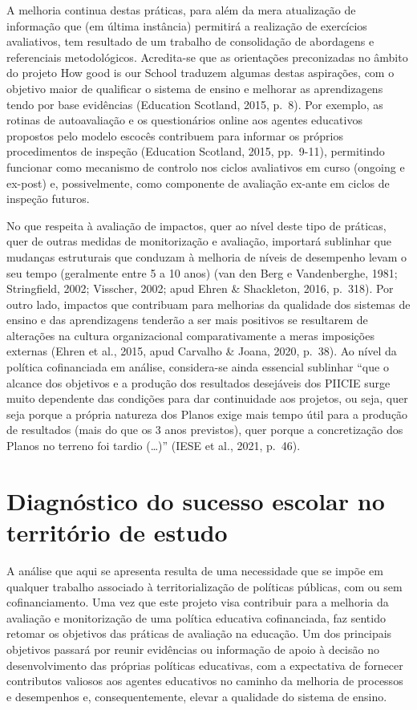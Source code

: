\documentclass[
]{book}
\begin{document}
A melhoria continua destas práticas, para além da mera atualização de informação que (em última instância) permitirá a realização de exercícios avaliativos, tem resultado de um trabalho de consolidação de abordagens e referenciais metodológicos. Acredita-se que as orientações preconizadas no âmbito do projeto How good is our School traduzem algumas destas aspirações, com o objetivo maior de qualificar o sistema de ensino e melhorar as aprendizagens tendo por base evidências (Education Scotland, 2015, p.~8). Por exemplo, as rotinas de autoavaliação e os questionários online aos agentes educativos propostos pelo modelo escocês contribuem para informar os próprios procedimentos de inspeção (Education Scotland, 2015, pp.~9-11), permitindo funcionar como mecanismo de controlo nos ciclos avaliativos em curso (ongoing e ex-post) e, possivelmente, como componente de avaliação ex-ante em ciclos de inspeção futuros.

No que respeita à avaliação de impactos, quer ao nível deste tipo de práticas, quer de outras medidas de monitorização e avaliação, importará sublinhar que mudanças estruturais que conduzam à melhoria de níveis de desempenho levam o seu tempo (geralmente entre 5 a 10 anos) (van den Berg e Vandenberghe, 1981; Stringfield, 2002; Visscher, 2002; apud Ehren \& Shackleton, 2016, p.~318). Por outro lado, impactos que contribuam para melhorias da qualidade dos sistemas de ensino e das aprendizagens tenderão a ser mais positivos se resultarem de alterações na cultura organizacional comparativamente a meras imposições externas (Ehren et al., 2015, apud Carvalho \& Joana, 2020, p.~38). Ao nível da política cofinanciada em análise, considera-se ainda essencial sublinhar ``que o alcance dos objetivos e a produção dos resultados desejáveis dos PIICIE surge muito dependente das condições para dar continuidade aos projetos, ou seja, quer seja porque a própria natureza dos Planos exige mais tempo útil para a produção de resultados (mais do que os 3 anos previstos), quer porque a concretização dos Planos no terreno foi tardio (\ldots)'' (IESE et al., 2021, p.~46).

\hypertarget{diagnuxf3stico-do-sucesso-escolar-no-territuxf3rio-de-estudo}{%
\chapter{Diagnóstico do sucesso escolar no território de estudo}\label{diagnuxf3stico-do-sucesso-escolar-no-territuxf3rio-de-estudo}}

A análise que aqui se apresenta resulta de uma necessidade que se impõe em qualquer trabalho associado à territorialização de políticas públicas, com ou sem cofinanciamento. Uma vez que este projeto visa contribuir para a melhoria da avaliação e monitorização de uma política educativa cofinanciada, faz sentido retomar os objetivos das práticas de avaliação na educação. Um dos principais objetivos passará por reunir evidências ou informação de apoio à decisão no desenvolvimento das próprias políticas educativas, com a expectativa de fornecer contributos valiosos aos agentes educativos no caminho da melhoria de processos e desempenhos e, consequentemente, elevar a qualidade do sistema de ensino.
\end{document}
